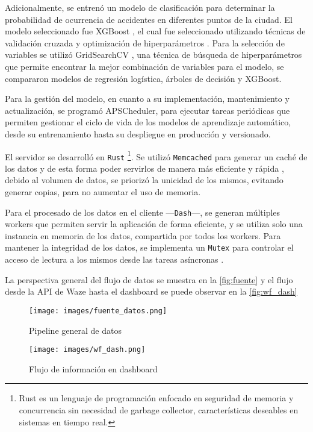 \documentclass[12pt]{article}
\begin{document}
Adicionalmente, se entrenó un modelo de clasificación para determinar la probabilidad de ocurrencia de accidentes en diferentes puntos de la ciudad. El modelo seleccionado fue XGBoost \parencite{chen2016xgboost}, el cual fue seleccionado utilizando técnicas de validación cruzada y optimización de hiperparámetros \parencite{geron2019hands}. Para la selección de variables se utilizó GridSearchCV \parencite{pedregosa2011scikit, geron2019hands}, una técnica de búsqueda de hiperparámetros que permite encontrar la mejor combinación de variables para el modelo, se compararon modelos de regresión logística, árboles de decisión y XGBoost.

Para la gestión del modelo, en cuanto a su implementación, mantenimiento y actualización, se programó APSCheduler, para ejecutar tareas periódicas que permiten gestionar el ciclo de vida de los modelos de aprendizaje automático, desde su entrenamiento hasta su despliegue en producción y versionado.

El servidor se desarrolló en \texttt{Rust} \parencite{rust2025}\footnote{Rust es un lenguaje de programación enfocado en seguridad de memoria y concurrencia sin necesidad de garbage collector, características deseables en sistemas en tiempo real.}. Se utilizó \texttt{Memcached} para generar un caché de los datos y de esta forma poder servirlos de manera más eficiente y rápida \parencite{fitzpatrick2004memcached}, debido al volumen de datos, se priorizó la unicidad de los mismos, evitando generar copias, para no aumentar el uso de memoria.

Para el procesado de los datos en el cliente —\texttt{Dash}—, se generan múltiples workers que permiten servir la aplicación de forma eficiente, y se utiliza solo una instancia en memoria de los datos, compartida por todos los workers. Para mantener la integridad de los datos, se implementa un \texttt{Mutex} para controlar el acceso de lectura a los mismos desde las tareas asíncronas \parencite{ramalho2015fluent}.

La perspectiva general del flujo de datos se muestra en la \autoref{fig:fuente} y el flujo desde la API de Waze hasta el dashboard se puede observar en la \autoref{fig:wf_dash}

\begin{figure}[H]
    \centering
    \texttt{[image: images/fuente\_datos.png]}
    \caption{Pipeline general de datos}
    \label{fig:fuente}
\end{figure}

\begin{figure}[H]
    \centering
    \texttt{[image: images/wf\_dash.png]}
    \caption{Flujo de información en dashboard}
    \label{fig:wf_dash}
\end{figure}
\end{document}
